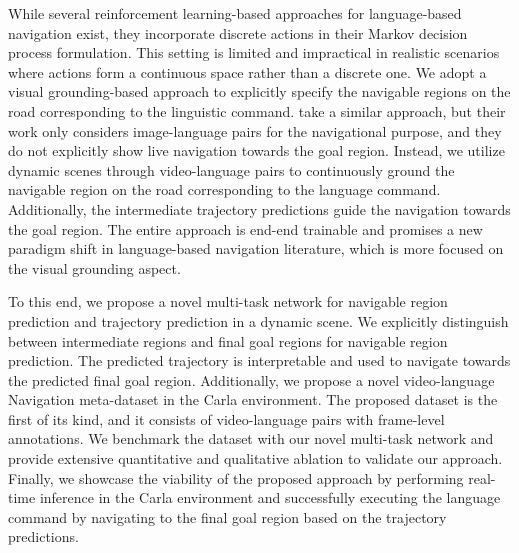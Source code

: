 \documentclass[letterpaper, 10 pt, conference]{ieeeconf}  %
\begin{document}

While several reinforcement learning-based approaches for language-based navigation exist, they incorporate discrete actions in their Markov decision process formulation. This setting is limited and impractical in realistic scenarios where actions form a continuous space rather than a discrete one. We adopt a visual grounding-based approach to explicitly specify the navigable regions on the road corresponding to the linguistic command.\cite{rufus2021grounding} take a similar approach, but their work only considers image-language pairs for the navigational purpose, and they do not explicitly show live navigation towards the goal region. Instead, we utilize dynamic scenes through video-language pairs to continuously ground the navigable region on the road corresponding to the language command. Additionally, the intermediate trajectory predictions guide the navigation towards the goal region. The entire approach is end-end trainable and promises a new paradigm shift in language-based navigation literature, which is more focused on the visual grounding aspect.

To this end, we propose a novel multi-task network for navigable region prediction and trajectory prediction in a dynamic scene. We explicitly distinguish between intermediate regions and final goal regions for navigable region prediction. The predicted trajectory is interpretable and used to navigate towards the predicted final goal region. Additionally, we propose a novel video-language Navigation meta-dataset in the Carla environment. The proposed dataset is the first of its kind, and it consists of video-language pairs with frame-level annotations. We benchmark the dataset with our novel multi-task network and provide extensive quantitative and qualitative ablation to validate our approach. Finally, we showcase the viability of the proposed approach by performing real-time inference in the Carla environment and successfully executing the language command by navigating to the final goal region based on the trajectory predictions.
\end{document}
